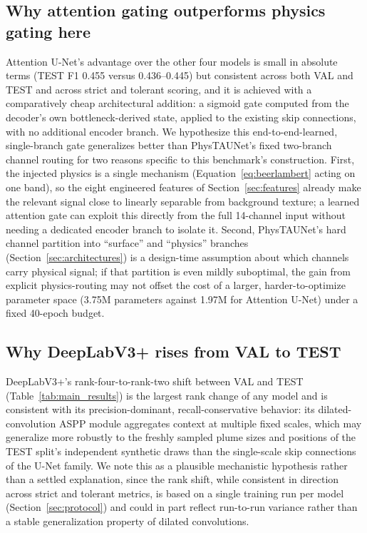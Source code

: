 \documentclass[10pt,twocolumn]{article}
\begin{document}
\subsection{Why attention gating outperforms physics gating here}
\label{sec:disc_attn}

Attention U-Net's advantage over the other four models is small in absolute terms (TEST F1 0.455 versus 0.436--0.445) but consistent across both VAL and TEST and across strict and tolerant scoring, and it is achieved with a comparatively cheap architectural addition: a sigmoid gate computed from the decoder's own bottleneck-derived state, applied to the existing skip connections, with no additional encoder branch. We hypothesize this end-to-end-learned, single-branch gate generalizes better than PhysTAUNet's fixed two-branch channel routing for two reasons specific to this benchmark's construction. First, the injected physics is a single mechanism (Equation~\eqref{eq:beerlambert} acting on one band), so the eight engineered features of Section~\ref{sec:features} already make the relevant signal close to linearly separable from background texture; a learned attention gate can exploit this directly from the full 14-channel input without needing a dedicated encoder branch to isolate it. Second, PhysTAUNet's hard channel partition into ``surface'' and ``physics'' branches (Section~\ref{sec:architectures}) is a design-time assumption about which channels carry physical signal; if that partition is even mildly suboptimal, the gain from explicit physics-routing may not offset the cost of a larger, harder-to-optimize parameter space (3.75M parameters against 1.97M for Attention U-Net) under a fixed 40-epoch budget.

\subsection{Why DeepLabV3+ rises from VAL to TEST}
\label{sec:disc_deep}

DeepLabV3+'s rank-four-to-rank-two shift between VAL and TEST (Table~\ref{tab:main_results}) is the largest rank change of any model and is consistent with its precision-dominant, recall-conservative behavior: its dilated-convolution ASPP module aggregates context at multiple fixed scales, which may generalize more robustly to the freshly sampled plume sizes and positions of the TEST split's independent synthetic draws than the single-scale skip connections of the U-Net family. We note this as a plausible mechanistic hypothesis rather than a settled explanation, since the rank shift, while consistent in direction across strict and tolerant metrics, is based on a single training run per model (Section~\ref{sec:protocol}) and could in part reflect run-to-run variance rather than a stable generalization property of dilated convolutions.
\end{document}
